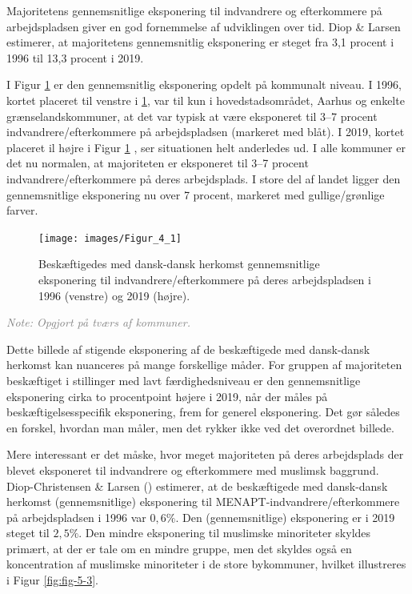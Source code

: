 \documentclass[
]{book}
\begin{document}
Majoritetens gennemsnitlige eksponering til indvandrere og efterkommere på arbejdspladsen giver en god fornemmelse af udviklingen over tid. Diop \& Larsen estimerer, at majoritetens gennemsnitlig eksponering er steget fra 3,1 procent i 1996 til 13,3 procent i 2019.

I Figur \ref{fig:fig-5-2} er den gennemsnitlig eksponering opdelt på kommunalt niveau. I 1996, kortet placeret til venstre i \ref{fig:fig-5-2}, var til kun i hovedstadsområdet, Aarhus og enkelte grænselandskommuner, at det var typisk at være eksponeret til 3--7 procent indvandrere/efterkommere på arbejdspladsen (markeret med blåt). I 2019, kortet placeret il højre i Figur \ref{fig:fig-5-2} , ser situationen helt anderledes ud. I alle kommuner er det nu normalen, at majoriteten er eksponeret til 3--7 procent indvandrere/efterkommere på deres arbejdsplads. I store del af landet ligger den gennemsnitlige eksponering nu over 7 procent, markeret med gullige/grønlige farver.

\newpage

\begin{figure}
\texttt{[image: images/Figur\_4\_1]} \caption{Beskæftigedes med dansk-dansk herkomst gennemsnitlige eksponering til indvandrere/efterkommere på deres arbejdspladsen i 1996 (venstre) og 2019 (højre).}\label{fig:fig-5-2}
\end{figure}

\begin{footnotesize}\textit{\textcolor{gray}{
Note: Opgjort på tværs af kommuner.
}}
\end{footnotesize}

Dette billede af stigende eksponering af de beskæftigede med dansk-dansk herkomst kan nuanceres på mange forskellige måder. For gruppen af majoriteten beskæftiget i stillinger med lavt færdighedsniveau er den gennemsnitlige eksponering cirka to procentpoint højere i 2019, når der måles på beskæftigelsesspecifik eksponering, frem for generel eksponering. Det gør således en forskel, hvordan man måler, men det rykker ikke ved det overordnet billede.

Mere interessant er det måske, hvor meget majoriteten på deres arbejdsplads der blevet eksponeret til indvandrere og efterkommere med muslimsk baggrund. Diop-Christensen \& Larsen () estimerer, at de beskæftigede med dansk-dansk herkomst (gennemsnitlige) eksponering til MENAPT-indvandrere/efterkommere på arbejdspladsen i 1996 var \(0,6\%\). Den (gennemsnitlige) eksponering er i 2019 steget til \(2,5\%\). Den mindre eksponering til muslimske minoriteter skyldes primært, at der er tale om en mindre gruppe, men det skyldes også en koncentration af muslimske minoriteter i de store bykommuner, hvilket illustreres i Figur \ref{fig:fig-5-3}.
\end{document}
